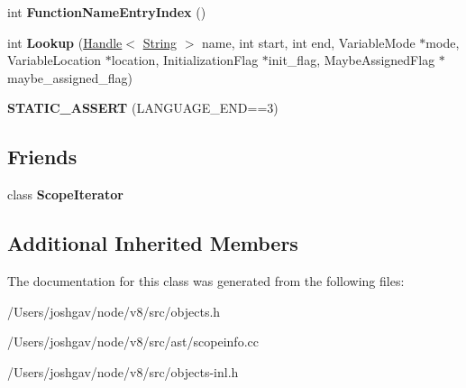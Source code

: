 \begin{DoxyCompactItemize}
\item 
int {\bfseries Function\+Name\+Entry\+Index} ()\hypertarget{classv8_1_1internal_1_1_scope_info_ae948c6d42a9d77012940feba4aef9c55}{}\label{classv8_1_1internal_1_1_scope_info_ae948c6d42a9d77012940feba4aef9c55}

\item 
int {\bfseries Lookup} (\hyperlink{classv8_1_1internal_1_1_handle}{Handle}$<$ \hyperlink{classv8_1_1internal_1_1_string}{String} $>$ name, int start, int end, Variable\+Mode $\ast$mode, Variable\+Location $\ast$location, Initialization\+Flag $\ast$init\+\_\+flag, Maybe\+Assigned\+Flag $\ast$maybe\+\_\+assigned\+\_\+flag)\hypertarget{classv8_1_1internal_1_1_scope_info_a70387e20bef37b6ac82113eeff208945}{}\label{classv8_1_1internal_1_1_scope_info_a70387e20bef37b6ac82113eeff208945}

\item 
{\bfseries S\+T\+A\+T\+I\+C\+\_\+\+A\+S\+S\+E\+RT} (L\+A\+N\+G\+U\+A\+G\+E\+\_\+\+E\+ND==3)\hypertarget{classv8_1_1internal_1_1_scope_info_a1ebbfc0eb4816027d7f80cfba6c6fc1d}{}\label{classv8_1_1internal_1_1_scope_info_a1ebbfc0eb4816027d7f80cfba6c6fc1d}

\end{DoxyCompactItemize}
\subsection*{Friends}
\begin{DoxyCompactItemize}
\item 
class {\bfseries Scope\+Iterator}\hypertarget{classv8_1_1internal_1_1_scope_info_a5b3c4fdd7007cd7d1cf8d30b390a3637}{}\label{classv8_1_1internal_1_1_scope_info_a5b3c4fdd7007cd7d1cf8d30b390a3637}

\end{DoxyCompactItemize}
\subsection*{Additional Inherited Members}


The documentation for this class was generated from the following files\+:\begin{DoxyCompactItemize}
\item 
/\+Users/joshgav/node/v8/src/objects.\+h\item 
/\+Users/joshgav/node/v8/src/ast/scopeinfo.\+cc\item 
/\+Users/joshgav/node/v8/src/objects-\/inl.\+h\end{DoxyCompactItemize}
